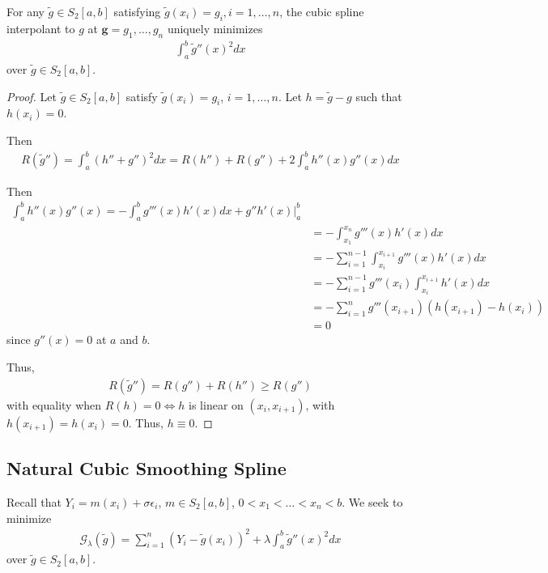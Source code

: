 \begin{thm}
  \label{defn:nonparametric_regression:3}
  For any $\tilde g \in S_{2}[a, b]$ satisfying $\tilde g(x_{i})=
  g_{i}, i=1, \dots, n$, the cubic spline interpolant to $g$ at
  $\mathbf{g} = g_{1}, \dots, g_{n}$ uniquely minimizes
  \begin{align}
    \label{eq:66}
    \int_{a}^{b} \tilde g''(x)^{2} dx
  \end{align} over $\tilde g \in S_{2}[a, b]$.
\end{thm}

\begin{proof}
  Let $\tilde g \in S_{2}[a,b]$ satisfy $\tilde g(x_{i}) = g_{i}$, $i
  = 1, \dots, n$.  Let $h = \tilde g  - g$ such that $h(x_{i}) = 0$.

  Then
  \begin{align}
    \label{eq:67}
    R(\tilde g'') = \int_{a}^{b} (h'' + g'')^{2} dx = R(h'')+ R(g'') +
    2 \int_{a}^{b} h''(x) g''(x) dx
  \end{align}

  Then
  \begin{align}
    \label{eq:68}
    \int_{a}^{b} h''(x) g''(x) = -\int_{a}^{b} g'''(x) h'(x) dx +
    g''h'(x)|_{a}^{b} \\
    &= -\int_{x_{1}}^{x_{n}} g'''(x) h'(x) dx \\
    &= -\sum_{i=1}^{n-1} \int_{x_{i}}^{x_{i+1}} g'''(x) h'(x) dx \\
    &= -\sum_{i=1}^{n-1} g'''(x_{i}) \int_{x_{i}}^{x_{i+1}} h'(x) dx  \\
    &= -\sum_{i=1}^{n} g'''(x_{i+1}) (h(x_{i+1})- h(x_{i})) \\
    &= 0
  \end{align} since $g''(x) = 0$ at $a$ and $b$.

  Thus,
  \begin{align}
    \label{eq:69}
    R(\tilde g'') = R(g'') + R(h'') \geq R(g'')
  \end{align}
  with equality when $R(h) = 0 \iff h$ is linear on $(x_{i},
  x_{i+1})$, with $h(x_{i+1}) = h(x_{i}) = 0$.  Thus, $h \equiv 0$.
\end{proof}

\subsection{Natural Cubic Smoothing Spline}
\label{sec:natur-cubic-smooth}

Recall that $Y_{i} = m(x_{i}) + \sigma \epsilon_{i}$, $m \in
S_{2}[a,b]$, $0 < x_{1} < \dots < x_{n} < b$.  We seek to minimize
\begin{align}
  \label{eq:70}
  \mathcal{G}_{\lambda}(\tilde g) = \sum_{i=1}^{n} (Y_{i} - \tilde
  g(x_{i}))^{2} + \lambda \int_{a}^{b}  \tilde g''(x)^{2} dx 
\end{align} over $\tilde g \in S_{2}[a, b]$.

